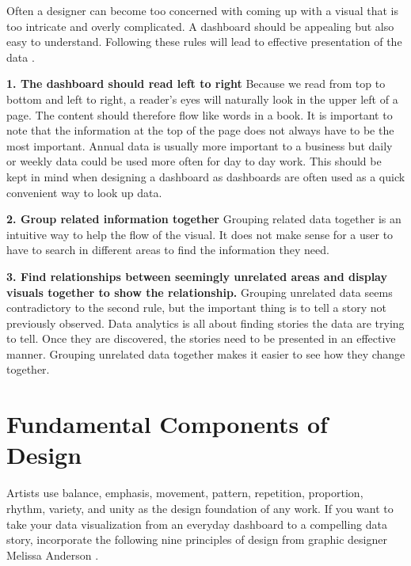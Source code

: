 \documentclass[]{book}
\theoremstyle{definition}
\theoremstyle{definition}
\theoremstyle{definition}
\theoremstyle{remark}
\begin{document}
Often a designer can become too concerned with coming up with a visual
that is too intricate and overly complicated. A dashboard should be
appealing but also easy to understand. Following these rules will lead
to effective presentation of the data \citep{intuitive-dash}.

\textbf{1. The dashboard should read left to right} Because we read from
top to bottom and left to right, a reader's eyes will naturally look in
the upper left of a page. The content should therefore flow like words
in a book. It is important to note that the information at the top of
the page does not always have to be the most important. Annual data is
usually more important to a business but daily or weekly data could be
used more often for day to day work. This should be kept in mind when
designing a dashboard as dashboards are often used as a quick convenient
way to look up data.

\textbf{2. Group related information together} Grouping related data
together is an intuitive way to help the flow of the visual. It does not
make sense for a user to have to search in different areas to find the
information they need.

\textbf{3. Find relationships between seemingly unrelated areas and
display visuals together to show the relationship.} Grouping unrelated
data seems contradictory to the second rule, but the important thing is
to tell a story not previously observed. Data analytics is all about
finding stories the data are trying to tell. Once they are discovered,
the stories need to be presented in an effective manner. Grouping
unrelated data together makes it easier to see how they change together.

\section{Fundamental Components of
Design}\label{fundamental-components-of-design}

Artists use balance, emphasis, movement, pattern, repetition,
proportion, rhythm, variety, and unity as the design foundation of any
work. If you want to take your data visualization from an everyday
dashboard to a compelling data story, incorporate the following nine
principles of design from graphic designer Melissa Anderson
\citep{design_principles}.
\end{document}
